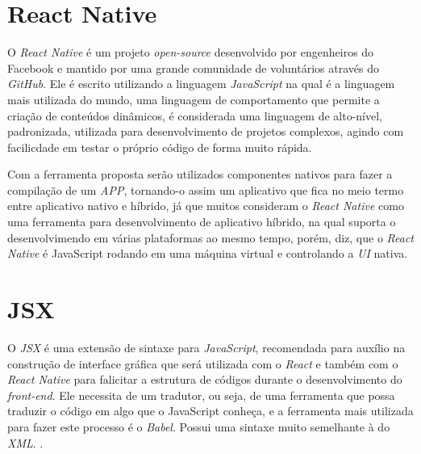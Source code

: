 \section{React Native}

O \textit{React Native} é um projeto \textit{open-source} desenvolvido por engenheiros do Facebook e mantido por uma grande comunidade de voluntários através do \textit{GitHub}. Ele é escrito utilizando a linguagem \textit{JavaScript} na qual é a linguagem mais utilizada do mundo, uma linguagem de comportamento que permite a criação de conteúdos dinâmicos, é considerada uma linguagem de alto-nível, padronizada, utilizada para desenvolvimento de projetos complexos, agindo com facilicdade em testar o próprio código de forma muito rápida.

Com a ferramenta proposta serão utilizados componentes nativos para fazer a compilação de um \textit{APP}, tornando-o assim um aplicativo que fica no meio termo entre aplicativo nativo e híbrido, já que muitos consideram o \textit{React Native} como uma ferramenta para desenvolvimento de aplicativo híbrido, na qual suporta o desenvolvimendo em várias plataformas ao mesmo tempo, porém,  diz, que o \textit{React Native} é JavaScript rodando em uma máquina virtual e controlando a \textit{UI} nativa.



\section{JSX}
O \textit{JSX} é uma extensão de sintaxe para \textit{JavaScript}, recomendada para auxílio na construção de interface gráfica que será utilizada com o \textit{React} e também com o \textit{React Native} para falicitar a estrutura de códigos durante o desenvolvimento do \textit{front-end}. Ele necessita de um tradutor, ou seja, de uma ferramenta que possa traduzir o código em algo que o JavaScript conheça, e a ferramenta mais utilizada para fazer este processo é o \textit{Babel}. Possui uma sintaxe muito semelhante à do \textit{XML}.  
\cite{jsx}.


